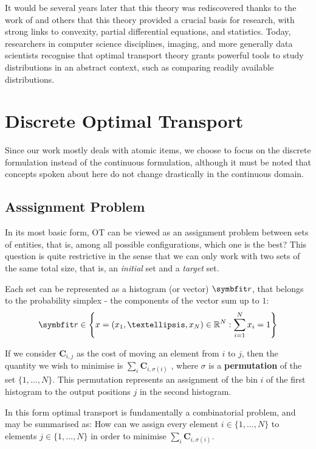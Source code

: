 It would be several years later that this theory was rediscovered thanks to the work of \textcite{Brenier1991PolarFunctions} and others that this theory provided a crucial basis for research, with strong links to convexity, partial differential equations, and statistics. Today, researchers in computer science disciplines, imaging, and more generally data scientists recognise that optimal transport theory grants powerful tools to study distributions in an abstract context, such as comparing readily available distributions.

\section{Discrete Optimal Transport}\label{sec:discrete-ot}

Since our work mostly deals with atomic items, we choose to focus on the discrete formulation instead of the continuous formulation, although it must be noted that concepts spoken about here do not change drastically in the continuous domain.

\subsection{Asssignment Problem}\label{ssec:ot-assignment-prob}

In its most basic form, OT can be viewed as an assignment problem between sets of entities, that is, among all possible configurations, which one is the best? This question is quite restrictive in the sense that we can only work with two sets of the same total size, that is, an \textit{initial} set and a \textit{target} set.

Each set can be represented as a histogram (or vector) $\bfitr$, that belongs to the probability simplex - the components of the vector sum up to $1$:
\begin{equation}
    \bfitr \in \left\{ x = (x_1, …, x_N) \in \mathbb{R}^N : \sum_{i=1}^N x_i = 1 \right\} 
    \label{eqn:r-simplex-defn}
\end{equation}

If we consider $\symbf{C}_{i,j}$ as the cost of moving an element from $i$ to $j$, then the quantity we wish to minimise is $\sum_{i} \symbf{C}_{i,\sigma(i)}$ , where $\sigma$ is a \textbf{permutation} of the set $\{1,\ldots, N\}$. This permutation represents an assignment of the bin $i$ of the first histogram to the output positions $j$ in the second histogram.

In this form optimal transport is fundamentally a combinatorial problem, and may be summarised as: 
How can we assign every element $i \in \{1, \ldots, N\}$ to elements $j \in \{1, \ldots, N\}$ in order to minimise $\sum_{i} \symbf{C}_{i,\sigma(i)}$.

